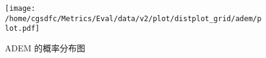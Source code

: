\begin{figure}[H]%
\centering%
\texttt{[image: /home/cgsdfc/Metrics/Eval/data/v2/plot/distplot\_grid/adem/plot.pdf]}%
\caption{ADEM 的概率分布图}%
\label{fig:ADEMdist}%
\end{figure}
